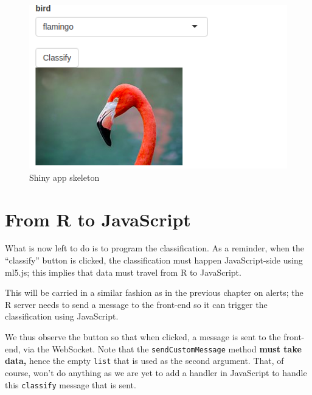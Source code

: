 \documentclass[
]{krantz}
\makeatletter
\newenvironment{Shaded}{\begin{snugshade}}{\end{snugshade}}
\newcommand{\KeywordTok}[1]{\textcolor[rgb]{0.27,0.27,0.27}{\textbf{#1}}}
\newcommand{\NormalTok}[1]{#1}
\newcommand{\OperatorTok}[1]{\textcolor[rgb]{0.43,0.43,0.43}{\textbf{#1}}}
\newcommand{\StringTok}[1]{\textcolor[rgb]{0.5,0.5,0.5}{#1}}
\newenvironment{kframe}{%
\medskip{}
\setlength{\fboxsep}{.8em}
 \def\at@end@of@kframe{}%
 \ifinner\ifhmode%
  \def\at@end@of@kframe{\end{minipage}}%
  \begin{minipage}{\columnwidth}%
 \fi\fi%
 \def\FrameCommand##1{\hskip\@totalleftmargin \hskip-\fboxsep
 \colorbox{shadecolor}{##1}\hskip-\fboxsep
     \hskip-\linewidth \hskip-\@totalleftmargin \hskip\columnwidth}%
 \MakeFramed {\advance\hsize-\width
   \@totalleftmargin\z@ \linewidth\hsize
   \@setminipage}}%
 {\par\unskip\endMakeFramed%
 \at@end@of@kframe}
\renewenvironment{Shaded}{\begin{kframe}}{\end{kframe}}
\makeatother
\begin{document}
\begin{figure}[t]

{\centering \includegraphics[width=1\linewidth]{images/shiny-complete-skeleton} 

}

\caption{Shiny app skeleton}\label{fig:shiny-complete-skeleton}
\end{figure}

\hypertarget{shiny-complete-r2js}{%
\section{From R to JavaScript}\label{shiny-complete-r2js}}

What is now left to do is to program the classification. As a reminder, when the ``classify'' button is clicked, the classification must happen JavaScript-side using ml5.js; this implies that data must travel from R to JavaScript.

This will be carried in a similar fashion as in the previous chapter on alerts; the R server needs to send a message to the front-end so it can trigger the classification using JavaScript.

\begin{Shaded}
\end{Shaded}

We thus observe the button so that when clicked, a message is sent to the front-end, via the WebSocket. Note that the \texttt{sendCustomMessage} method \textbf{must take data,} hence the empty \texttt{list} that is used as the second argument. That, of course, won't do anything as we are yet to add a handler in JavaScript to handle this \texttt{classify} message that is sent.
\end{document}
